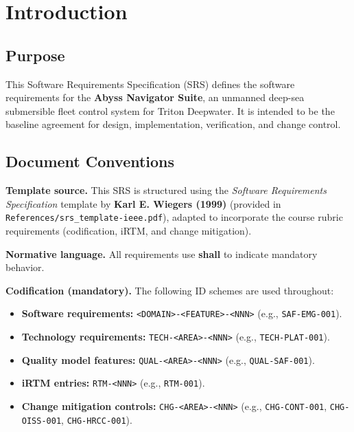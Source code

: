 \documentclass[11pt,a4paper]{article}
\begin{document}
\renewcommand{\contentsname}{Table of Contents}
\thispagestyle{empty}
\hypersetup{linkcolor=black}
\tableofcontents
\newpage
\hypersetup{linkcolor=blue}

\noindent{}

\bigskip

\section{Introduction}

\subsection{Purpose}
This Software Requirements Specification (SRS) defines the software requirements for the \textbf{Abyss Navigator Suite}, an unmanned deep-sea submersible fleet control system for Triton Deepwater. It is intended to be the baseline agreement for design, implementation, verification, and change control.

\subsection{Document Conventions}
\textbf{Template source.} This SRS is structured using the \textit{Software Requirements Specification} template by \textbf{Karl E. Wiegers (1999)} (provided in \texttt{References/srs\_template-ieee.pdf}), adapted to incorporate the course rubric requirements (codification, iRTM, and change mitigation).

\textbf{Normative language.} All requirements use \textbf{shall} to indicate mandatory behavior.

\textbf{Codification (mandatory).} The following ID schemes are used throughout:
\begin{itemize}[leftmargin=*,nosep]
  \item \textbf{Software requirements:} \texttt{<DOMAIN>-<FEATURE>-<NNN>} (e.g., \texttt{SAF-EMG-001}).
  \item \textbf{Technology requirements:} \texttt{TECH-<AREA>-<NNN>} (e.g., \texttt{TECH-PLAT-001}).
  \item \textbf{Quality model features:} \texttt{QUAL-<AREA>-<NNN>} (e.g., \texttt{QUAL-SAF-001}).
  \item \textbf{iRTM entries:} \texttt{RTM-<NNN>} (e.g., \texttt{RTM-001}).
  \item \textbf{Change mitigation controls:} \texttt{CHG-<AREA>-<NNN>} (e.g., \texttt{CHG-CONT-001}, \texttt{CHG-OISS-001}, \texttt{CHG-HRCC-001}).
\end{itemize}
\end{document}
